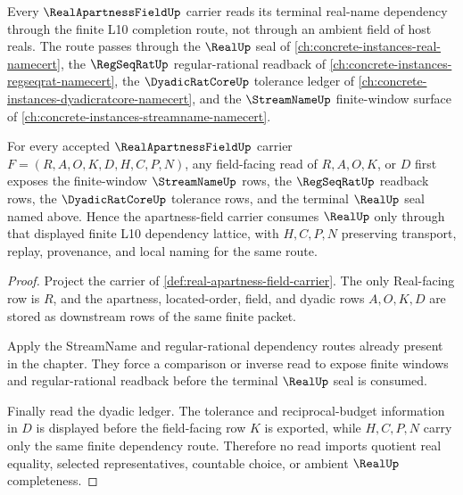 Every $\RealApartnessFieldUp$ carrier reads its terminal real-name dependency through the finite L10 completion route, not through an ambient field of host reals. The route passes through the $\RealUp$ seal of \autoref{ch:concrete-instances-real-namecert}, the $\RegSeqRatUp$ regular-rational readback of \autoref{ch:concrete-instances-regseqrat-namecert}, the $\DyadicRatCoreUp$ tolerance ledger of \autoref{ch:concrete-instances-dyadicratcore-namecert}, and the $\StreamNameUp$ finite-window surface of \autoref{ch:concrete-instances-streamname-namecert}.

\begin{proposition}
\label{prop:real-apartness-field-finite-completion-dependency-route}
For every accepted $\RealApartnessFieldUp$ carrier $F=(R,A,O,K,D,H,C,P,N)$, any field-facing read of $R,A,O,K$, or $D$ first exposes the finite-window $\StreamNameUp$ rows, the $\RegSeqRatUp$ readback rows, the $\DyadicRatCoreUp$ tolerance rows, and the terminal $\RealUp$ seal named above. Hence the apartness-field carrier consumes $\RealUp$ only through that displayed finite L10 dependency lattice, with $H,C,P,N$ preserving transport, replay, provenance, and local naming for the same route.
\end{proposition}
\begin{proof}
Project the carrier of \autoref{def:real-apartness-field-carrier}. The only Real-facing row is $R$, and the apartness, located-order, field, and dyadic rows $A,O,K,D$ are stored as downstream rows of the same finite packet.

Apply the StreamName and regular-rational dependency routes already present in the chapter. They force a comparison or inverse read to expose finite windows and regular-rational readback before the terminal $\RealUp$ seal is consumed.

Finally read the dyadic ledger. The tolerance and reciprocal-budget information in $D$ is displayed before the field-facing row $K$ is exported, while $H,C,P,N$ carry only the same finite dependency route. Therefore no read imports quotient real equality, selected representatives, countable choice, or ambient $\RealUp$ completeness.
\end{proof}
